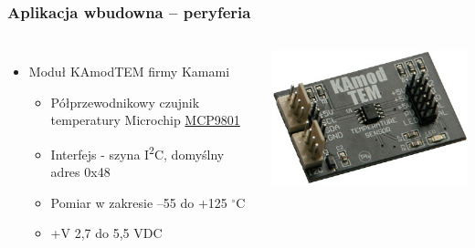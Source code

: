 \documentclass[dvipsnames,table]{beamer}
\begin{document}

\begin{frame}
\frametitle{Aplikacja wbudowna -- peryferia}
\begin{columns}[c]
\column{3in}
\begin{itemize}
	\item Moduł KAmodTEM firmy Kamami
	\begin{itemize}
		\item Półprzewodnikowy czujnik temperatury Microchip \href{http://www.microchip.com/wwwproducts/Devices.aspx?dDocName=en020950}{MCP9801}
		\item Interfejs - szyna I\textsuperscript{2}C, domyślny adres 0x48
		\item Pomiar w zakresie --55 do +125 $^\circ$C 
		\item +V 2,7 do 5,5 VDC
	\end{itemize}
\end{itemize}
\column{1.5in}
	\includegraphics[scale=0.3]{img_kamodtem.jpg}
\end{columns}

\end{frame}
\end{document}
